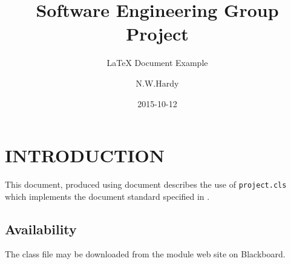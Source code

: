 \documentclass{project}
\begin{document}
\title{Software Engineering Group Project}
\subtitle{LaTeX Document Example}
\author{N.W.Hardy}     
\date{2015-10-12}
\maketitle
\tableofcontents
\newpage
\section{INTRODUCTION}
This document, produced using \LaTeXe document describes the use of
{\tt project.cls} which implements the document standard specified in
\cite{se.qa.03}.
\subsection{Availability}
The class file may be downloaded from the module web site on Blackboard.
\end{document}
